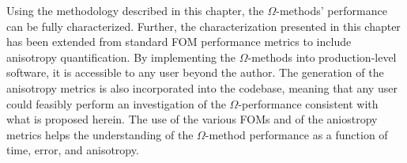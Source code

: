 Using the methodology described in this chapter, the $\Omega$-methods'
performance can be fully characterized. Further, the characterization presented
in this chapter has been
extended from standard FOM performance metrics to include anisotropy
quantification.
By implementing the $\Omega$-methods into production-level software, it is
accessible to any user beyond the author. The generation of the anisotropy
metrics is also incorporated into the codebase, meaning that any user could
feasibly perform an investigation of the $\Omega$-performance consistent with
what is proposed herein. The use of the various FOMs and of the aniostropy
metrics helps the understanding of the $\Omega$-method performance as a function
of time, error, and anisotropy.
